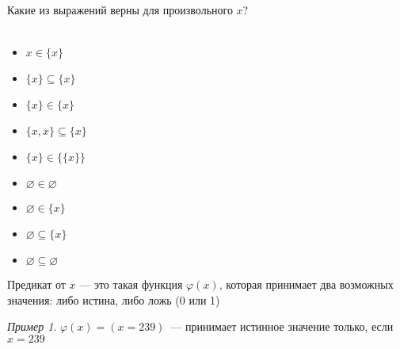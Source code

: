 \documentclass{article}
\theoremstyle{remark}
\newtheorem{example}{Пример}
\begin{document}
\begin{task}
	Какие из выражений верны для произвольного $x$?\\
	\\
	\begin{minipage}[c]{0.3\textwidth}
		\begin{itemize}
			\item $x \in \{x\}$
			\item $\{x\} \subseteq \{x\}$
			\item $\{x\} \in \{x\}$
		\end{itemize}
	\end{minipage}
	\begin{minipage}[c]{0.3\textwidth}
		\begin{itemize}
			\item $\{x,x\} \subseteq \{x\}$
			\item $\{x\} \in \{\{x\}\}$
			\item $\varnothing \in \varnothing$
		\end{itemize}
	\end{minipage}
	\begin{minipage}[c]{0.3\textwidth}
		\begin{itemize}
			\item $\varnothing \in \{x\}$
			\item $\varnothing \subseteq \{x\}$
			\item $\varnothing \subseteq \varnothing$
		\end{itemize}
	\end{minipage}
\end{task}

\begin{definition}
	Предикат от $x$ --- это такая функция $\varphi(x)$, которая принимает два возможных значения: либо истина, либо ложь (0 или 1)
\end{definition}

\begin{example}
	$\varphi(x) = (x = 239)$~--- принимает истинное значение только, если $x = 239$
\end{example}
\end{document}
